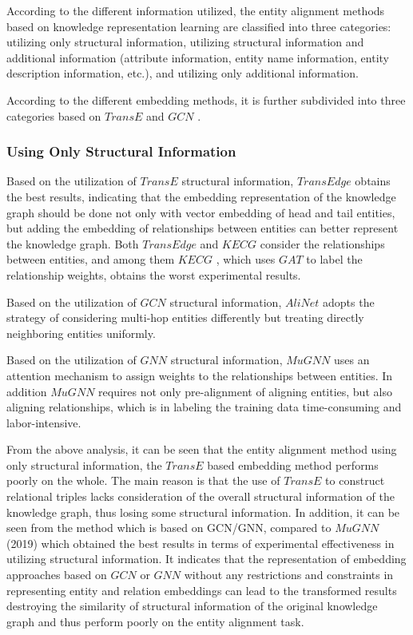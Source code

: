 \documentclass[sigconf]{acmart}
\begin{document}
{According to the different information utilized, the entity alignment methods based on knowledge representation learning are classified into three categories: utilizing only structural information, utilizing structural information and additional information (attribute information, entity name information, entity description information, etc.), and utilizing only additional information.

According to the different embedding methods, it is further subdivided into three categories based on $TransE$ and $GCN$ .

\subsubsection{Using Only Structural Information}

Based on the utilization of $TransE$ structural information, $TransEdge$ \cite{sun2019transedge} obtains the best results, indicating that the embedding representation of the knowledge graph should be done not only with vector embedding of head and tail entities, but adding the embedding of relationships between entities can better represent the knowledge graph. Both $TransEdge$ \cite{sun2019transedge}  and $KECG$ \cite{li2019semi}  consider the relationships between entities, and among them $KECG$ \cite{li2019semi} , which uses $GAT$ to label the relationship weights, obtains the worst experimental results.

Based on the utilization of $GCN$ structural information, $AliNet$ \cite{sun2020knowledge} adopts the strategy of considering multi-hop entities differently but treating directly neighboring entities uniformly.

Based on the utilization of $GNN$ structural information, $MuGNN$ \cite{cao2019multi} uses an attention mechanism to assign weights to the relationships between entities. In addition $MuGNN$ \cite{cao2019multi} requires not only pre-alignment of aligning entities, but also aligning relationships, which is in labeling the training data time-consuming and labor-intensive.

From the above analysis, it can be seen that the entity alignment method using only structural information, the $TransE$ based embedding method performs poorly on the whole. The main reason is that the use of $TransE$ to construct relational triples lacks consideration of the overall structural information of the knowledge graph, thus losing some structural information. In addition, it can be seen from the method which is based on GCN/GNN, compared to $MuGNN$ (2019) which obtained the best results in terms of experimental effectiveness in utilizing structural information. It indicates that the representation of embedding approaches based on $GCN$ or $GNN$ without any restrictions and constraints in representing entity and relation embeddings can lead to the transformed results destroying the similarity of structural information of the original knowledge graph and thus perform poorly on the entity alignment task.

}
\end{document}
